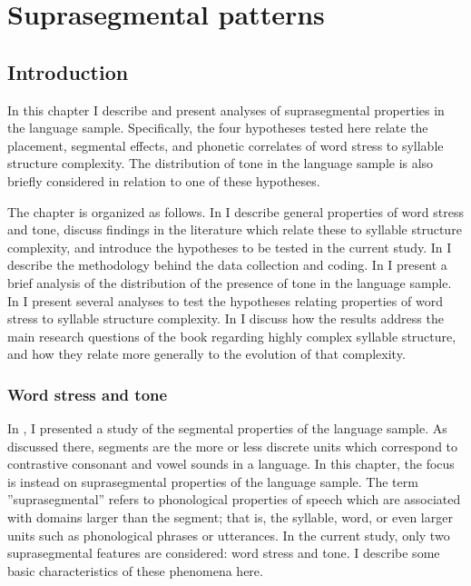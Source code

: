 \chapter{Suprasegmental patterns}\label{sec:5}
\section{{Introduction}}\label{sec:5.1}

  In this chapter I describe and present analyses of suprasegmental properties in the language sample. Specifically, the four hypotheses tested here relate the placement, segmental effects, and phonetic correlates of word stress to syllable structure complexity. The distribution of tone in the language sample is also briefly considered in relation to one of these hypotheses.

  The chapter is organized as follows. In  I describe general properties of word stress and tone, discuss findings in the literature which relate these to syllable structure complexity, and introduce the hypotheses to be tested in the current study. In  I describe the methodology behind the data collection and coding. In  I present a brief analysis of the distribution of the presence of tone in the language sample. In  I present several analyses to test the hypotheses relating properties of word stress to syllable structure complexity. In  I discuss how the results address the main research questions of the book regarding highly complex syllable structure, and how they relate more generally to the evolution of that complexity.

\subsection{Word stress and tone}\label{sec:5.1.1}

  In , I presented a study of the segmental properties of the language sample. As discussed there, segments are the more or less discrete units which correspond to contrastive consonant and vowel sounds in a language. In this chapter, the focus is instead on suprasegmental properties of the language sample. The term ”suprasegmental” refers to phonological properties of speech which are associated with domains larger than the segment; that is, the syllable, word, or even larger units such as phonological phrases or utterances. In the current study, only two suprasegmental features are considered: word stress and tone. I describe some basic characteristics of these phenomena here.

